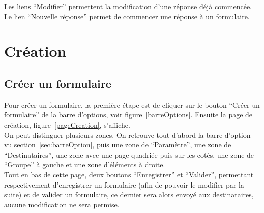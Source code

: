 \documentclass[a4paper,11pt,final]{report}
\begin{document}
Les liens ``Modifier'' permettent la modification d'une réponse déjà commencée. Le lien ``Nouvelle réponse'' permet de commencer une réponse à un formulaire.

\noindent\begin{minipage}{\linewidth}%
\label{zoneFormRecu}
\end{minipage}

\chapter{Création}
\section{Créer un formulaire}\label{CreerFormulaire}
Pour créer un formulaire, la première étape est de cliquer sur le bouton ``Créer un formulaire'' de la barre d'options, voir figure~\ref{barreOptions}. Ensuite la page de création, figure~\ref{pageCreation}, s'affiche.\\
On peut distinguer plusieurs zones. On retrouve tout d'abord la barre d'option vu section~\ref{sec:barreOption}, puis une zone de ``Paramètre'', une zone de ``Destinataires'', une zone avec une page quadriée puis sur les cotés, une zone de ``Groupe'' à gauche et une zone d'éléments à droite.\\
Tout en bas de cette page, deux boutons ``Enregistrer'' et ``Valider'', permettant respectivement d'enregistrer un formulaire (afin de pouvoir le modifier par la suite) et de valider un formulaire, ce dernier sera alors envoyé aux destinataires, aucune modification ne sera permise.
\end{document}
